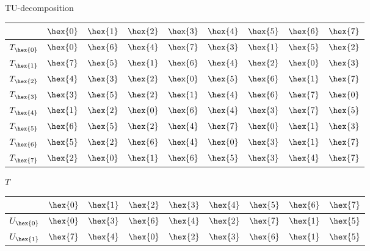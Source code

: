 {\begin{figure}
\begin{subfigure}{0.32\textwidth}
{
          \vspace{10pt}
          \caption{TU-decomposition}
    }
    \end{subfigure}
    \begin{subfigure}{0.32\textwidth}
      \begin{tabular}{l|rrrrrrrr}
& $\hex{0}$ & $\hex{1}$ & $\hex{2}$ & $\hex{3}$ & $\hex{4}$ & $\hex{5}$ & $\hex{6}$ & $\hex{7}$\\
        \hline
$T_{\hex{0}}$ & $\hex{0}$ & $\hex{6}$ & $\hex{4}$ & $\hex{7}$ & $\hex{3}$ & $\hex{1}$ & $\hex{5}$ & $\hex{2}$\\
$T_{\hex{1}}$ & $\hex{7}$ & $\hex{5}$ & $\hex{1}$ & $\hex{6}$ & $\hex{4}$ & $\hex{2}$ & $\hex{0}$ & $\hex{3}$\\
$T_{\hex{2}}$ & $\hex{4}$ & $\hex{3}$ & $\hex{2}$ & $\hex{0}$ & $\hex{5}$ & $\hex{6}$ & $\hex{1}$ & $\hex{7}$\\
$T_{\hex{3}}$ & $\hex{3}$ & $\hex{5}$ & $\hex{2}$ & $\hex{1}$ & $\hex{4}$ & $\hex{6}$ & $\hex{7}$ & $\hex{0}$\\
$T_{\hex{4}}$ & $\hex{1}$ & $\hex{2}$ & $\hex{0}$ & $\hex{6}$ & $\hex{4}$ & $\hex{3}$ & $\hex{7}$ & $\hex{5}$\\
$T_{\hex{5}}$ & $\hex{6}$ & $\hex{5}$ & $\hex{2}$ & $\hex{4}$ & $\hex{7}$ & $\hex{0}$ & $\hex{1}$ & $\hex{3}$\\
$T_{\hex{6}}$ & $\hex{5}$ & $\hex{2}$ & $\hex{6}$ & $\hex{4}$ & $\hex{0}$ & $\hex{3}$ & $\hex{1}$ & $\hex{7}$\\
$T_{\hex{7}}$ & $\hex{2}$ & $\hex{0}$ & $\hex{1}$ & $\hex{6}$ & $\hex{5}$ & $\hex{3}$ & $\hex{4}$ & $\hex{7}$\\
      \end{tabular}
      \caption{$T$}
    \end{subfigure}
    \begin{subfigure}{0.32\textwidth}
      \centering
      \begin{tabular}{l|rrrrrrrr}
& $\hex{0}$ & $\hex{1}$ & $\hex{2}$ & $\hex{3}$ & $\hex{4}$ & $\hex{5}$ & $\hex{6}$ & $\hex{7}$\\
        \hline
$U_{\hex{0}}$ & $\hex{0}$ & $\hex{3}$ & $\hex{6}$ & $\hex{4}$ & $\hex{2}$ & $\hex{7}$ & $\hex{1}$ & $\hex{5}$\\
$U_{\hex{1}}$ & $\hex{7}$ & $\hex{4}$ & $\hex{0}$ & $\hex{2}$ & $\hex{3}$ & $\hex{6}$ & $\hex{1}$ & $\hex{5}$\\

\end{tabular}
\end{subfigure}
\end{figure}}
